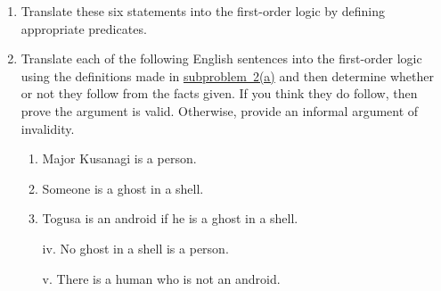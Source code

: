 \begin{enumerate}
        \begin{enumerate}
            \item\label{prob:2a}
                Translate these six statements into the first-order logic by defining appropriate predicates.
            \item
                Translate each of the following English sentences into the first-order logic
                using the definitions made in \hyperref[prob:2a]{subproblem~2(a)}
                and then determine whether or not they follow from the facts given.
                If you think they do follow, then prove the argument is valid.
                Otherwise, provide an informal argument of invalidity.
                \begin{center}
                    \begin{minipage}{0.5\linewidth}
                        \begin{enumerate}
                            \item
                                Major Kusanagi is a person.
                            \item
                                Someone is a ghost in a shell.
                            \item
                                Togusa is an android if he is a ghost in a shell.
                        \end{enumerate}
                    \end{minipage}%
                    \begin{minipage}{0.5\linewidth}
                        \begin{enumerate}
                            \item[iv.]
                                No ghost in a shell is a person.
                            \item[v.]
                                There is a human who is not an android.
                        \end{enumerate}
                    \end{minipage}
                \end{center}
        \end{enumerate}
\end{enumerate}


